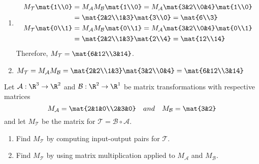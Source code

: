 \begin{exercises}
\begin{problist}
\begin{solution}
			\begin{enumerate}
				\item 
				\begin{align*}
					M_{\mathcal{T}}\mat{1\\0}&=M_{\mathcal A}M_{\mathcal{B}}\mat{1\\0}=M_{\mathcal A}\mat{3&2\\0&4}\mat{1\\0}\\
					&=\mat{2&2\\1&3}\mat{3\\0}=\mat{6\\3}\\
					M_{\mathcal{T}}\mat{0\\1}&=M_{\mathcal A}M_{\mathcal B}\mat{0\\1}=M_{\mathcal A}\mat{3&2\\0&4}\mat{0\\1}\\
					&=\mat{2&2\\1&3}\mat{2\\4}=\mat{12\\14}
				\end{align*}
				Therefore, $M_{\mathcal T}=\mat{6&12\\3&14}$.

				\item $M_{\mathcal T}= M_{\mathcal A}M_{\mathcal B}= \mat{2&2\\1&3}\mat{3&2\\0&4}=
					\mat{6&12\\3&14}$
			\end{enumerate}
		\end{solution}

		\prob Let $\mathcal A: \R^{3}\to \R^{2}$ and $\mathcal B: \R^{2}\to \R^{1}$
		be matrix transformations with respective matrices
		\[
			M_{\mathcal A}= \mat{2&1&0\\2&3&0}\quad and \quad M_{\mathcal B}=
			\mat{3&2}
		\]
		 and let $M_{\mathcal T}$ be the matrix for $\mathcal T=\mathcal B\circ \mathcal
		A$.
		\begin{enumerate}
			\item Find $M_{\mathcal T}$ by computing input-output pairs for $\mathcal
				T$.

			\item Find $M_{\mathcal T}$ by using matrix multiplication applied
				to $M_{\mathcal A}$ and $M_{\mathcal B}$.
		\end{enumerate}


\end{problist}
\end{exercises}
